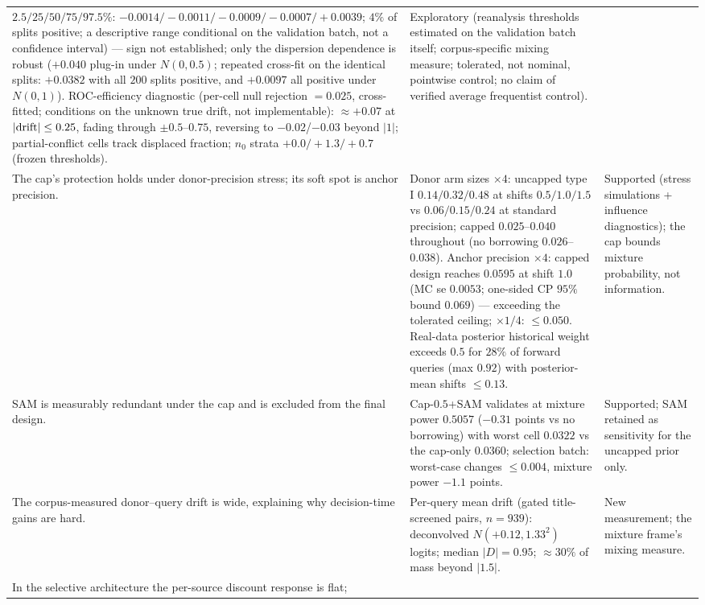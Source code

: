 \documentclass[11pt]{article}
\begin{document}
\begin{longtable}{p{} p{} p{}}
$2.5/25/50/75/97.5\%$: $-0.0014/-0.0011/-0.0009/-0.0007/+0.0039$; $4\%$
of splits positive; a descriptive range conditional on the validation
batch, not a confidence interval) --- sign not established; only the
dispersion
dependence is robust ($+0.040$ plug-in under $N(0,0.5)$; repeated
cross-fit on the identical splits: $+0.0382$ with all $200$ splits
positive, and $+0.0097$ all positive under $N(0,1)$). ROC-efficiency
diagnostic (per-cell null rejection $=0.025$, cross-fitted; conditions on
the unknown true drift, not implementable): $\approx +0.07$ at
$|{\rm drift}| \le 0.25$, fading through $\pm 0.5$--$0.75$, reversing to
$-0.02$/$-0.03$ beyond $|1|$; partial-conflict cells track displaced
fraction; $n_0$ strata $+0.0/+1.3/+0.7$ (frozen thresholds). &
Exploratory
(reanalysis thresholds estimated on the validation batch itself;
corpus-specific mixing measure; tolerated, not nominal, pointwise
control; no claim of verified average frequentist control). \\
The cap's protection holds under donor-precision stress; its soft spot is
anchor precision. & Donor arm sizes $\times 4$: uncapped type I
$0.14/0.32/0.48$ at shifts $0.5/1.0/1.5$ vs $0.06/0.15/0.24$ at standard
precision; capped $0.025$--$0.040$ throughout (no borrowing
$0.026$--$0.038$). Anchor precision $\times 4$: capped design reaches
$0.0595$ at shift $1.0$ (MC se $0.0053$; one-sided CP $95\%$ bound
$0.069$) --- exceeding the tolerated ceiling; $\times 1/4$: $\le 0.050$.
Real-data posterior
historical weight exceeds $0.5$ for $28\%$ of forward queries (max
$0.92$) with posterior-mean shifts $\le 0.13$. & Supported (stress
simulations + influence diagnostics); the cap bounds mixture probability,
not information. \\
SAM is measurably redundant under the cap and is excluded from the final
design. & Cap-$0.5$+SAM validates at mixture power $0.5057$ ($-0.31$
points vs no borrowing) with worst cell $0.0322$ vs the cap-only
$0.0360$; selection batch: worst-case changes $\le 0.004$, mixture power
$-1.1$ points. & Supported; SAM retained as sensitivity for the uncapped
prior only. \\
The corpus-measured donor--query drift is wide, explaining why
decision-time gains are hard. & Per-query mean drift (gated
title-screened pairs, $n=939$): deconvolved $N(+0.12, 1.33^2)$ logits;
median $|D| = 0.95$; $\approx 30\%$ of mass beyond $|1.5|$. & New
measurement; the mixture frame's mixing measure. \\
In the selective architecture the per-source discount response is flat;

\end{longtable}
\end{document}
